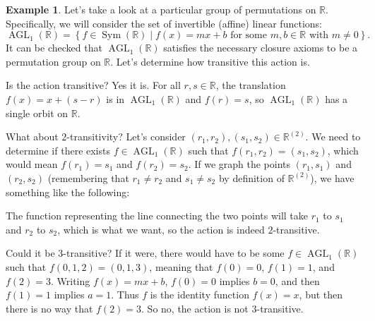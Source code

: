 \documentclass[11pt]{amsart}
\theoremstyle{plain}
\theoremstyle{definition}
\newtheorem{example}{Example}
\theoremstyle{remark}
\DeclareMathOperator{\Sym}{Sym}
\DeclareMathOperator{\AGL}{AGL}
\begin{document}
\begin{example}\label{exam.AGL1R}
Let's take a look at a particular group of permutations on $\mathbb{R}$. Specifically, we will consider the set of invertible (affine) linear functions: \[\AGL_1(\mathbb{R}) = \left\{ f \in \Sym(\mathbb{R}) \mid \text{$f(x) = mx+b$ for some $m,b\in \mathbb{R}$ with $m\neq 0$}\right\}.\]
It can be checked that $\AGL_1(\mathbb{R})$ satisfies the necessary closure axioms to be a permutation group on $\mathbb{R}$. Let's determine how transitive this action is.

Is the action transitive? Yes it is. For all $r,s\in \mathbb{R}$, the translation $f(x) = x + (s-r)$ is in $\AGL_1(\mathbb{R})$ and $f(r) = s$, so $\AGL_1(\mathbb{R})$ has a single orbit on $\mathbb{R}$.

What about $2$-transitivity? Let's consider $(r_1,r_2),(s_1,s_2)\in \mathbb{R}^{(2)}$. We need to determine if there exists $f\in \AGL_1(\mathbb{R})$ such that $f (r_1,r_2) = (s_1,s_2)$, which would mean $f(r_1) = s_1$ and $f(r_2) = s_2$. If we graph the points $(r_1, s_1)$ and $(r_2, s_2)$ (remembering that $r_1 \neq r_2$ and $s_1 \neq s_2$ by definition of $\mathbb{R}^{(2)}$), we have something like the following:
\begin{center}
\end{center}
The function representing the line connecting the two points will take $r_1$ to $s_1$ and $r_2$ to $s_2$, which is what we want, so the action is indeed $2$-transitive.

Could it be $3$-transitive? If it were,  there would have to be some $f\in \AGL_1(\mathbb{R})$ such that $f (0,1,2) = (0,1,3)$, meaning that $f(0) = 0$, $f(1) = 1$, and $f(2) = 3$. Writing $f(x) = mx+b$, $f(0) = 0$ implies $b=0$, and then $f(1) = 1$ implies $a = 1$. Thus $f$ is the identity function $f(x) = x$, but then there is no way that $f(2) = 3$. So no, the action is not $3$-transitive.
\end{example}
\end{document}
